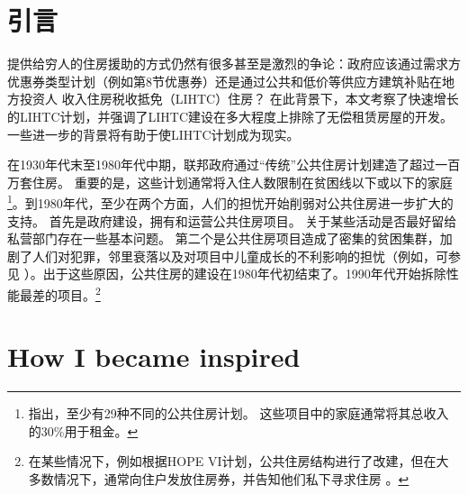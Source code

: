 \documentclass[lang=cn,11pt,a4paper]{elegantpaper}
\begin{document}
\section{引言}

提供给穷人的住房援助的方式仍然有很多甚至是激烈的争论：政府应该通过需求方优惠券类型计划（例如第8节优惠券）还是通过公共和低价等供应方建筑补贴在地方投资人 收入住房税收抵免（LIHTC）住房？ 在此背景下，本文考察了快速增长的LIHTC计划，并强调了LIHTC建设在多大程度上排除了无偿租赁房屋的开发。 一些进一步的背景将有助于使LIHTC计划成为现实。

在1930年代末至1980年代中期，联邦政府通过“传统”公共住房计划建造了超过一百万套住房。 重要的是，这些计划通常将入住人数限制在贫困线以下或以下的家庭 \citep{Olsen2003365}\footnote{\cite{Olsen2003365}指出，至少有29种不同的公共住房计划。 这些项目中的家庭通常将其总收入的30\%用于租金。}。到1980年代，至少在两个方面，人们的担忧开始削弱对公共住房进一步扩大的支持。 首先是政府建设，拥有和运营公共住房项目。 关于某些活动是否最好留给私营部门存在一些基本问题。 第二个是公共住房项目造成了密集的贫困集群，加剧了人们对犯罪，邻里衰落以及对项目中儿童成长的不利影响的担忧（例如，可参见 \cite{Currie200099,Jencks1990111}）。出于这些原因，公共住房的建设在1980年代初结束了。1990年代开始拆除性能最差的项目。\footnote{在某些情况下，例如根据HOPE VI计划，公共住房结构进行了改建，但在大多数情况下，通常向住户发放住房券，并告知他们私下寻求住房 \cite{Jacob2004233}。}




\appendix
\appendixpage
\addappheadtotoc
\section{How I became inspired}
\end{document}
